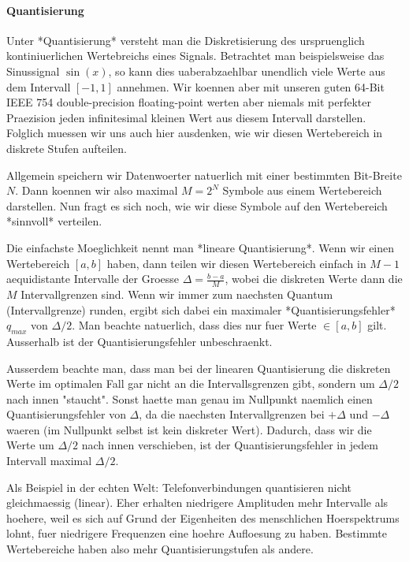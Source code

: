 \paragraph{ Quantisierung}

Unter *Quantisierung* versteht man die Diskretisierung des urspruenglich
kontiniuerlichen Wertebreichs eines Signals. Betrachtet man beispielsweise das
Sinussignal $\sin(x)$, so kann dies uaberabzaehlbar unendlich viele Werte aus
dem Intervall $[-1, 1]$ annehmen. Wir koennen aber mit unseren guten 64-Bit IEEE
754 double-precision floating-point werten aber niemals mit perfekter Praezision
jeden infinitesimal kleinen Wert aus diesem Intervall darstellen. Folglich
muessen wir uns auch hier ausdenken, wie wir diesen Wertebereich in diskrete
Stufen aufteilen.

Allgemein speichern wir Datenwoerter natuerlich mit einer bestimmten Bit-Breite
$N$. Dann koennen wir also maximal $M = 2^N$ Symbole aus einem Wertebereich
darstellen. Nun fragt es sich noch, wie wir diese Symbole auf den Wertebereich
*sinnvoll* verteilen.

Die einfachste Moeglichkeit nennt man *lineare Quantisierung*. Wenn wir einen
Wertebereich $[a, b]$ haben, dann teilen wir diesen Wertebereich einfach in $M -
1$ aequidistante Intervalle der Groesse $\Delta = \frac{b - a}{M}$, wobei die
diskreten Werte dann die $M$ Intervallgrenzen sind. Wenn wir immer zum naechsten
Quantum (Intervallgrenze) runden, ergibt sich dabei ein maximaler
*Quantisierungsfehler* $q_{max}$ von $\Delta/2$. Man beachte natuerlich, dass
dies nur fuer Werte $\in [a, b]$ gilt. Ausserhalb ist der Quantisierungsfehler
unbeschraenkt.

Ausserdem beachte man, dass man bei der linearen Quantisierung die diskreten
Werte im optimalen Fall gar nicht an die Intervallsgrenzen gibt, sondern um
$\Delta/2$ nach innen "staucht". Sonst haette man genau im Nullpunkt naemlich
einen Quantisierungsfehler von $\Delta$, da die naechsten Intervallgrenzen bei
$+\Delta$ und $-\Delta$ waeren (im Nullpunkt selbst ist kein diskreter
Wert). Dadurch, dass wir die Werte um $\Delta/2$ nach innen verschieben, ist der
Quantisierungsfehler in jedem Intervall maximal $\Delta/2$.

Als Beispiel in der echten Welt: Telefonverbindungen quantisieren nicht
gleichmaessig (linear). Eher erhalten niedrigere Amplituden mehr Intervalle als
hoehere, weil es sich auf Grund der Eigenheiten des menschlichen Hoerspektrums
lohnt, fuer niedrigere Frequenzen eine hoehre Aufloesung zu haben. Bestimmte
Wertebereiche haben also mehr Quantisierungstufen als andere.

